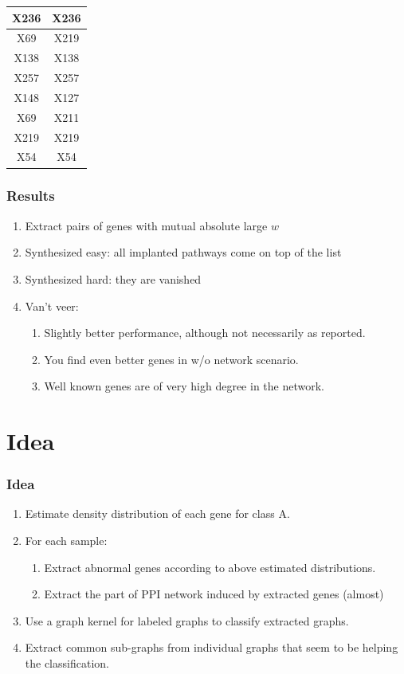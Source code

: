 \documentclass{beamer}
\newcommand{\boz}{\cellcolor{pathwaynode}}
\newcommand{\ghool}{\cellcolor{independentnode}}
\begin{document}
\begin{frame}[plain]
\begin{textblock*}{\paperwidth}
\begin{tabular}{| c c |}
X236   &  X236  \\ \hline
X69   &  X219  \\ \hline
\boz X138   &  \boz X138  \\ \hline
\ghool X257   &  \ghool X257  \\ \hline
\boz X148   &  X127  \\ \hline
X69   &  X211  \\ \hline
X219   &  X219  \\ \hline
\ghool X54   &  \ghool X54  \\ \hline
    \end{tabular}
    \hspace{.5em}
  \end{textblock*}
\end{frame}

\begin{frame}
\frametitle{Results}
\begin{enumerate}
\item Extract pairs of genes with mutual absolute large $w$ 
\item Synthesized easy: all implanted pathways come on top of the list 
\item Synthesized hard: they are vanished \pause
\item Van't veer: 
  \begin{enumerate}
    \item Slightly better performance, although not necessarily as reported.
    \item You find even better genes in w/o network scenario.
    \item Well known genes are of very high degree in the network.
  \end{enumerate}
\end{enumerate}
\end{frame}

\section{Idea}
\begin{frame}
\frametitle{Idea}
\begin{enumerate}
\item Estimate density distribution of each gene for class A. \pause
\item For each sample:
  \begin{enumerate}
  \item Extract abnormal genes according to above estimated distributions.
  \item Extract the part of PPI network induced by extracted genes (almost)
  \end{enumerate}\pause
\item Use a graph kernel for labeled graphs to classify extracted graphs. \pause
\item Extract common sub-graphs from individual graphs that seem to be helping the classification.
\end{enumerate}
\end{frame}
\end{document}
